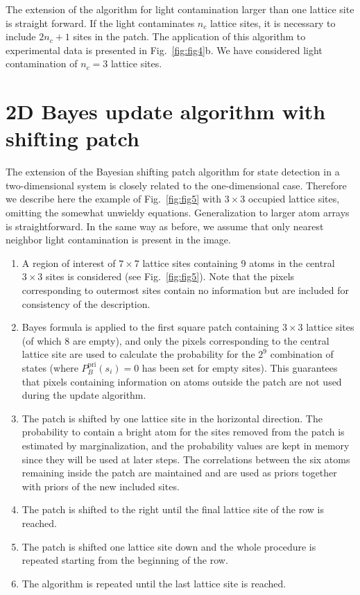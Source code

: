 \documentclass[aps,prl,twocolumn,english,showpacs]{revtex4-1}
\begin{document}
The extension of the algorithm for light contamination larger than one lattice site is straight forward. If the light contaminates $n_c$ lattice sites, it is necessary to include $2n_c+1$ sites in the patch. The application of this algorithm to experimental data is presented in Fig.~\ref{fig:fig4}b. We have considered light contamination of $n_c=3$ lattice sites.


\section{2D Bayes update algorithm with shifting patch}

The extension of the Bayesian shifting patch algorithm for state detection in a two-dimensional system is closely related to the one-dimensional case. Therefore we describe here the example of Fig.~\ref{fig:fig5} with $3\times3$ occupied lattice sites, omitting the somewhat unwieldy equations. Generalization to larger atom arrays is straightforward. In the same way as before, we assume that only nearest neighbor light contamination is present in the image.  

\begin{enumerate}[leftmargin=0.5cm]

\item A region of interest of $7\times7$ lattice sites containing 9 atoms in the central $3\times3$ sites is considered (see Fig.~\ref{fig:fig5}). Note that the pixels corresponding to outermost sites contain no information but are included for consistency of the description.

\item Bayes formula is applied to the first square patch containing $3\times3$ lattice sites (of which 8 are empty), and only the pixels corresponding to the central lattice site are used to calculate the probability for the $2^{9}$ combination of states (where $P^\text{pri}_B(s_{i})=0$ has been set for empty sites). This guarantees that pixels containing information on atoms outside the patch are not used during the update algorithm.

\item The patch is shifted by one lattice site in the horizontal direction. The probability to contain a bright atom for the sites removed from the patch is estimated by marginalization, and the probability values are kept in memory since they will be used at later steps. The correlations between the six atoms remaining inside the patch are maintained and are used as priors together with priors of the new included sites.

\item The patch is shifted to the right until the final lattice site of the row is reached.

\item The patch is shifted one lattice site down and the whole procedure is repeated starting from the beginning of the row. 

\item The algorithm is repeated until the last lattice site is reached.

\end{enumerate}
\end{document}
